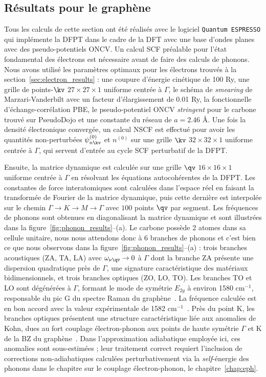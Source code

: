 \subsection{Résultats pour le graphène}\label{sec:phonon_results}
Tous les calculs de cette section ont été réalisés avec le logiciel \texttt{Quantum ESPRESSO} qui implémente la DFPT dans le cadre de la DFT avec une base d'ondes planes avec des pseudo-potentiels ONCV. Un calcul SCF préalable pour l'état fondamental des électrons est nécessaire avant de faire des calculs de phonons. Nous avons utilisé les paramètres optimaux pour les électrons trouvés à la section~\ref{sec:electron_results} : une coupure d'énergie cinétique de 100 Ry, une grille de points-$\kv$ $27\times27\times1$ uniforme centrée à $\Gamma$, le schéma de \textit{smearing} de Marzari-Vanderbilt avec un facteur d'élargissement de 0.01 Ry, la fonctionnelle d'échange-corrélation PBE, le pseudo-potentiel ONCV \textit{stringent} pour le carbone trouvé sur PseudoDojo et une constante du réseau de $a=2.46$ \AA. Une fois la densité électronique convergée, un calcul NSCF est effectué pour avoir les quantités non-perturbées $\psi_{n\kv}^{(0)}$ et $n^{(0)}$ sur une grille $\kv$ $32\times32\times1$ uniforme centrée à $\Gamma$, qui servent d'entrée au cycle SCF perturbatif de la DFPT.

Ensuite, la matrice dynamique est calculée sur une grille $\qv$ $16\times16\times 1$ uniforme centrée à $\Gamma$ en résolvant les équations autocohérentes de la DFPT. Les constantes de force interatomiques sont calculées dans l'espace réel en faisant la transformée de Fourier de la matrice dynamique, puis cette dernière est interpolée sur le chemin $\Gamma\to K\to M\to \Gamma$ avec $100$ points $\qv$ par segment. Les fréquences de phonons sont obtenues en diagonalisant la matrice dynamique et sont illustrées dans la figure~\ref{fig:phonon_results}--(a). Le carbone possède 2 atomes dans sa cellule unitaire, nous nous attendons donc à 6 branches de phonons et c'est bien ce que nous observons dans la figure~\ref{fig:phonon_results}--(a) : trois branches acoustiques (ZA, TA, LA) avec $\omega_{\nu\qv}\to 0$ à $\Gamma$ dont la branche ZA présente une dispersion quadratique près de $\Gamma$, une signature caractéristique des matériaux bidimensionnels, et trois branches optiques (ZO, LO, TO). Les branches TO et LO sont dégénérées à $\Gamma$, formant le mode de symétrie $E_{2g}$ à environ 1580 cm$^{-1}$, responsable du pic G du spectre Raman du graphène~\cite{tuinstraRamanSpectrumGraphite1970}. La fréquence calculée est en bon accord avec la valeur expérimentale de 1582 cm$^{-1}$~\cite{ferrariRamanSpectrumGraphene2006,ferrariRamanSpectroscopyVersatile2013a}. Près du point K, les branches optiques présentent une structure caractéristique liée aux anomalies de Kohn, dues au fort couplage électron-phonon aux points de haute symétrie $\Gamma$ et K de la BZ du graphène~\cite{lazzeriNonadiabaticKohnanomalyDoped2006,pisanaBornOppenheimerBreakdownGraphene2007}. Dans l'approximation adiabatique employée ici, ces anomalies sont sous-estimées ; leur traitement correct requiert l'inclusion de corrections non-adiabatiques calculées perturbativement via la \textit{self}-énergie des phonons dans le chapitre sur le couplage électron-phonon, le chapitre~\ref{chap:eph}.

